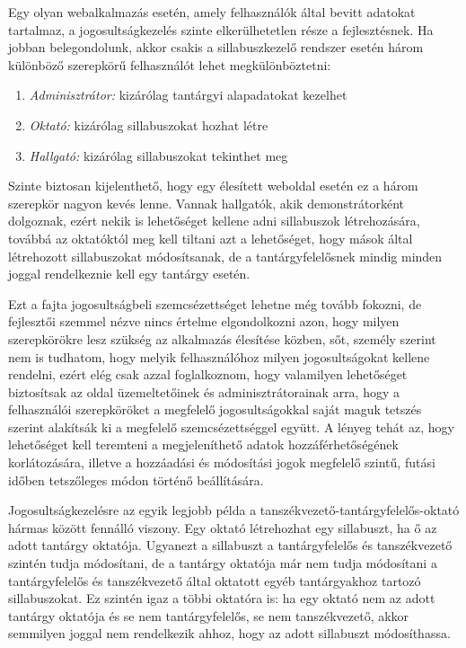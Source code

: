 \documentclass[hidelinks, 12pt, a4paper]{report}
\begin{document}
Egy olyan webalkalmazás esetén, amely felhasználók által bevitt adatokat tartalmaz, a jogosultságkezelés szinte elkerülhetetlen része a fejlesztésnek. Ha jobban belegondolunk, akkor csakis a sillabuszkezelő rendszer esetén három különböző szerepkörű felhasználót lehet megkülönböztetni:
\begin{enumerate}
\item \emph{Adminisztrátor:} kizárólag tantárgyi alapadatokat kezelhet
\item \emph{Oktató:} kizárólag sillabuszokat hozhat létre
\item \emph{Hallgató:} kizárólag sillabuszokat tekinthet meg
\end{enumerate}
Szinte biztosan kijelenthető, hogy egy élesített weboldal esetén ez a három szerepkör nagyon kevés lenne. Vannak hallgatók, akik demonstrátorként dolgoznak, ezért nekik is lehetőséget kellene adni sillabuszok létrehozására, továbbá az oktatóktól meg kell tiltani azt a lehetőséget, hogy mások által létrehozott sillabuszokat módosítsanak, de a tantárgyfelelősnek mindig minden joggal rendelkeznie kell egy tantárgy esetén. 

Ezt a fajta jogosultságbeli szemcsézettséget lehetne még tovább fokozni, de fejlesztői szemmel nézve nincs értelme elgondolkozni azon, hogy milyen szerepkörökre lesz szükség az alkalmazás élesítése közben, sőt, személy szerint nem is tudhatom, hogy melyik felhasználóhoz milyen jogosultságokat kellene rendelni, ezért elég csak azzal foglalkoznom, hogy valamilyen lehetőséget biztosítsak az oldal üzemeltetőinek és adminisztrátorainak arra, hogy a felhasználói szerepköröket a megfelelő jogosultságokkal saját maguk tetszés szerint alakítsák ki a megfelelő szemcsézettséggel együtt. A lényeg tehát az, hogy lehetőséget kell teremteni a megjeleníthető adatok hozzáférhetőségének korlátozására, illetve a hozzáadási és módosítási jogok megfelelő szintű, futási időben tetszőleges módon történő beállítására.

Jogosultságkezelésre az egyik legjobb példa a tanszékvezető-tantárgyfelelős-oktató hármas között fennálló viszony. Egy oktató létrehozhat egy sillabuszt, ha ő az adott tantárgy oktatója. Ugyanezt a sillabuszt a tantárgyfelelős és tanszékvezető szintén tudja módosítani, de a tantárgy oktatója már nem tudja módosítani a tantárgyfelelős és tanszékvezető által oktatott egyéb tantárgyakhoz tartozó sillabuszokat. Ez szintén igaz a többi oktatóra is: ha egy oktató nem az adott tantárgy oktatója és se nem tantárgyfelelős, se nem tanszékvezető, akkor semmilyen joggal nem rendelkezik ahhoz, hogy az adott sillabuszt módosíthassa.
\end{document}
